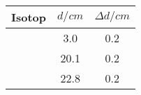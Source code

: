 \begin{tabular}{lSS}
\toprule
Isotop & {$d / \si{cm}$} & {$\Delta d / \si{cm}$} \\ \midrule
{} & 3.0 & 0.2 \\
 & 20.1 & 0.2 \\
 & 22.8 & 0.2 \\ \bottomrule
\end{tabular}